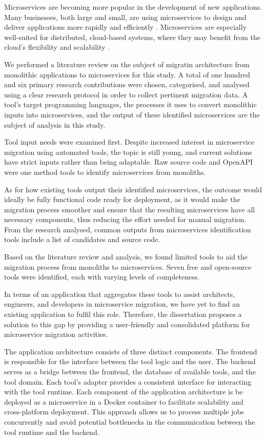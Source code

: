 Microservices are becoming more popular in the development of new applications.
Many businesses, both large and small, are using microservices to design and
deliver applications more rapidly and efficiently
\cite{richardson-microservices}. Microservices are especially well-suited for
distributed, cloud-based systems, where they may benefit from the cloud's
flexibility and scalability \cite{fowler-microservices-prerequisites}.

We performed a literature review on the subject of migratin architecture from
monolithic applications to microservices for this study. A total of one hundred
and six primary research contributions were chosen, categorised, and analysed
using a clear research protocol in order to collect pertinent migration data. A
tool's target programming languages, the processes it uses to convert
monolithic inputs into microservices, and the output of these identified
microservices are the subject of analysis in this study.

Tool input needs were examined first. Despite increased interest in
microservice migration using automated tools, the topic is still young, and
current solutions have strict inputs rather than being adaptable. Raw source
code and OpenAPI were one method tools to identify microservices from
monoliths.

As for how existing tools output their identified microservices, the outcome
would ideally be fully functional code ready for deployment, as it would make
the migration process smoother and ensure that the resulting microservices have
all necessary components, thus reducing the effort needed for manual migration.
From the research analysed, common outputs from microservices identification
tools include a list of candidates and source code.

Based on the literature review and analysis, we found limited tools to aid the
migration process from monoliths to microservices. Seven free and open-source
tools were identified, each with varying levels of completeness.

In terms of an application that aggregates these tools to assist architects,
engineers, and developers in microservice migration, we have yet to find an
existing application to fulfil this role. Therefore, the dissertation proposes
a solution to this gap by providing a user-friendly and consolidated platform
for microservice migration activities.

The application architecture consists of three distinct components. The
frontend is responsible for the interface between the tool logic and the user.
The backend serves as a bridge between the frontend, the database of available
tools, and the tool domain. Each tool's adapter provides a consistent interface
for interacting with the tool runtime. Each component of the application
architecture is be deployed as a microservice in a Docker container to
facilitate scalability and cross-platform deployment. This approach allows us
to process multiple jobs concurrently and avoid potential bottlenecks in the
communication between the tool runtime and the backend.

